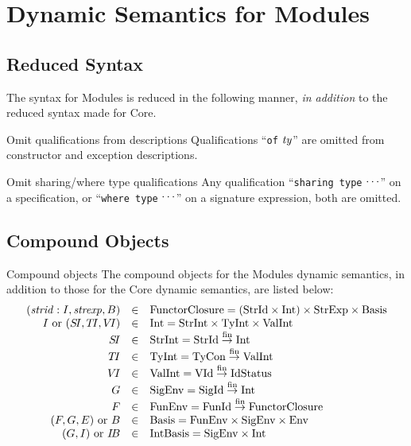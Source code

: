 \chapter{Dynamic Semantics for Modules}

\section{Reduced Syntax}

\begin{clause}{}
The syntax for Modules is reduced in the following manner, \emph{in addition}
to the reduced syntax made for Core.
\end{clause}

\begin{clause}{Omit qualifications from descriptions}
Qualifications ``\texttt{of} $\textit{ty\/}$'' are omitted from constructor and
exception descriptions.
\end{clause}

\begin{clause}{Omit sharing/where type qualifications}
Any qualification ``\texttt{sharing type} $\mathinner{{}^{\textstyle .\,.\,.}}$'' on a specification,
or ``\texttt{where type} $\mathinner{{}^{\textstyle .\,.\,.}}$'' on a signature expression, both
are omitted. 
\end{clause}

\section{Compound Objects}\label{sec:dynamic-modules:compound-objects}

\begin{definition}{Compound objects}\label{defn:dynamic-modules:compound-objects}
The compound objects for the Modules dynamic semantics, in addition to
those for the Core dynamic semantics, are listed below:
\begin{equation*}
\begin{array}{rcl}
(\textit{strid\/}:I,\textit{strexp\/},B)
                & \in   & {\rm FunctorClosure} = ({\rm StrId}\times{\rm Int})\times{\rm StrExp}\times{\rm Basis}\\
I\ {\rm or}\ (\mbox{$S\!I$},\mbox{$T\!I$},\mbox{$V\!I$})
                & \in   & {\rm Int} = {\rm StrInt}\times{\rm TyInt}\times{\rm ValInt}\\
        \mbox{$S\!I$}     & \in   & {\rm StrInt} = {\rm StrId}\stackrel{{\rm fin}}{\to}{\rm Int}\\
        \mbox{$T\!I$}     & \in   & {\rm TyInt} =  {\rm TyCon}\stackrel{{\rm fin}}{\to}{\rm ValInt}\\
        \mbox{$V\!I$}     & \in   & {\rm ValInt} = {\rm VId}\stackrel{{\rm fin}}{\to}\hbox{\rm IdStatus}\\ 
        G      & \in   & {\rm SigEnv} = {\rm SigId}\stackrel{{\rm fin}}{\to}{\rm Int}\\
        F      & \in   & {\rm FunEnv} = {\rm FunId}\stackrel{{\rm fin}}{\to}{\rm FunctorClosure}\\
(F,G,E)\ {\rm or}\ B
                & \in   & {\rm Basis} = {\rm FunEnv}\times{\rm SigEnv}\times{\rm Env}\\
(G,I)\ {\rm or}\ \mbox{$I\!B$}
                & \in   & {\rm IntBasis} = {\rm SigEnv}\times{\rm Int}
\end{array}
\end{equation*}
\end{definition}

